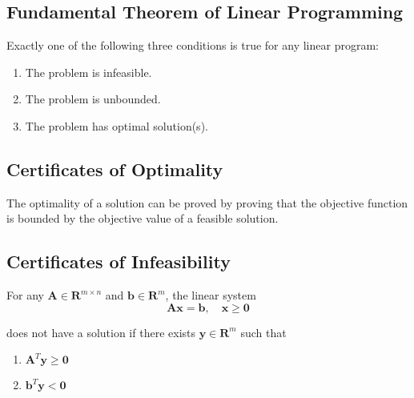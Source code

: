 \subsection{Fundamental Theorem of Linear Programming}
\begin{theorem}\label{FTLP}
Exactly one of the following three conditions is true for any linear program:
\begin{enumerate}
    \item The problem is infeasible.
    \item The problem is unbounded.
    \item The problem has optimal solution(s).
\end{enumerate}
\end{theorem}


\subsection{Certificates of Optimality}
The optimality of a solution can be proved by proving that the objective function is bounded by the objective value of a feasible solution.


\subsection{Certificates of Infeasibility}
\begin{theorem}
For any $\mathbf{A}\in \mathbf{R}^{m\times n}$ and $\mathbf{b}\in \mathbf{R}^{m}$, the linear system
\begin{equation*}
    \mathbf{Ax} = \mathbf{b}, \quad \mathbf{x} \geq \mathbf{0}
\end{equation*}

does not have a solution if there exists $\mathbf{y}\in \mathbf{R}^{m}$ such that
    \begin{enumerate}
        \item  \begin{center} $\mathbf{A}^T \mathbf{y} \geq \mathbf{0}$ \end{center}
        \item  \begin{center} $\mathbf{b}^T \mathbf{y} < \mathbf{0}$ \end{center}
    \end{enumerate}

\end{theorem}


